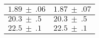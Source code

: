 \begin{tabular}  {l|l}
	$1.89~\pm~.06$ & $1.87~\pm~.07$\\\hline
	$20.3~\pm~.5$ & $20.3~\pm~.5$\\\hline
	$22.5~\pm~.1$ & $22.5~\pm~.1$\\
	
\end{tabular}